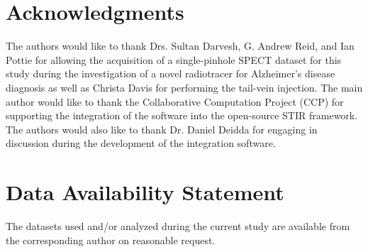 \documentclass[utf8]{FrontiersinVancouver}
\begin{document}

\section*{Acknowledgments}
The authors would like to thank Drs. Sultan Darvesh, G. Andrew Reid, and Ian Pottie for allowing the acquisition of a single-pinhole SPECT dataset for this study during the investigation of a novel radiotracer for Alzheimer's disease diagnosis as well as Christa Davis for performing the tail-vein injection. The main author would like to thank the Collaborative Computation Project (CCP) for supporting the integration of the software into the open-source STIR framework. The authors would also like to thank Dr. Daniel Deidda for engaging in discussion during the development of the integration software.



\section*{Data Availability Statement}
The datasets used and/or analyzed during the current study are available from the corresponding author on reasonable request.




\end{document}
